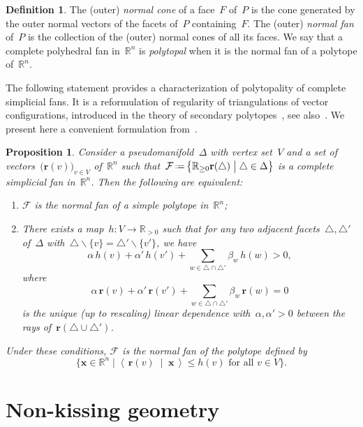 \documentclass{amsart}
\newtheorem{proposition}[theorem]{Proposition}
\theoremstyle{definition}
\newtheorem{definition}[theorem]{Definition}
\newcommand{\R}{\mathbb{R}} %
\renewcommand{\b}[1]{\mathbf{#1}} %
\newcommand{\bigset}[2]{\big\{ #1 \;\big|\; #2 \big\}} %
\newcommand{\ssm}{\smallsetminus} %
\newcommand{\dotprod}[2]{\left\langle \, #1 \; \middle| \; #2 \, \right\rangle} %
\newcommand{\eqdef}{\mbox{\,\raisebox{0.2ex}{\scriptsize\ensuremath{\mathrm:}}\ensuremath{=}\,}} %
\newcommand{\darkblue}{\color{darkblue}} %
\newcommand{\defn}[1]{\textsl{\darkblue #1}} %
\newcommand{\Fan}{\mathcal{F}} %
\begin{document}
\begin{definition}
The (outer) \defn{normal cone} of a face~$F$ of~$P$ is the cone generated by the outer normal vectors of the facets of~$P$ containing~$F$.
The (outer) \defn{normal fan} of~$P$ is the collection of the (outer) normal cones of all its faces.
We say that a complete polyhedral fan in~$\R^n$ is \defn{polytopal} when it is the normal fan of a polytope of~$\R^n$.
\end{definition}

The following statement provides a characterization of polytopality of complete simplicial fans.
It is a reformulation of regularity of triangulations of vector configurations, introduced in the theory of secondary polytopes~\cite{GelfandKapranovZelevinsky}, see also~\cite{DeLoeraRambauSantos}.
We present here a convenient formulation from~\cite[Lem.~2.1]{ChapotonFominZelevinsky}.

\begin{proposition}
\label{prop:characterizationPolytopalFan}
Consider a pseudomanifold~$\Delta$ with vertex set~$V$ and a set of vectors~$\big( \b{r}(v) \big)_{v \in V}$ of~$\R^n$ such that~$\Fan \eqdef \bigset{\R_{\ge 0}\b{r}(\triangle)}{\triangle \in \Delta}$ is a complete simplicial fan in~$\R^n$.
Then the following are equivalent:
\begin{enumerate}
\item $\Fan$ is the normal fan of a simple polytope in~$\R^n$;
\item There exists a map~$h: V \to \R_{> 0}$ such that for any two adjacent facets~$\triangle, \triangle'$ of~$\Delta$ with~$\triangle \ssm \{v\} = \triangle' \ssm \{v'\}$, we have
\[
\alpha \, h(v) + \alpha' \, h(v') + \sum_{w \in \triangle \cap \triangle'} \beta_{w} \, h(w) > 0,
\]
where
\[
\alpha \, \b{r}(v) + \alpha' \, \b{r}(v') + \sum_{w \in \triangle \cap \triangle'} \beta_{w} \, \b{r}(w) = 0
\]
is the unique (up to rescaling) linear dependence with~$\alpha, \alpha' > 0$ between the rays of~${\b{r}(\triangle \cup \triangle')}$.
\end{enumerate}
Under these conditions, $\Fan$ is the normal fan of the polytope defined by
\[
\bigset{\b{x} \in \R^n}{\dotprod{\b{r}(v)}{\b{x}} \le h(v) \text{ for all } v \in V}.
\]
\end{proposition}


\section{Non-kissing geometry}
\label{sec:associahedron}
\end{document}
